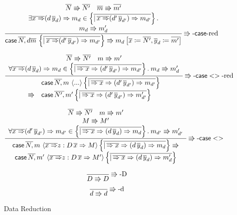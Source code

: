 \begin{figure}
\[
\frac{\begin{array}{c}
\overline{N}\Rrightarrow\overline{N'}\quad\overline{m}\Rrightarrow\overline{m'}\\
\exists\overline{x\Rightarrow}(d\,\overline{y}_{d})\Rightarrow m_{d}\in\left\{ \overline{|\,\overline{x\Rightarrow}(d'\,\overline{y}_{d'})\Rightarrow m_{d'}}\right\}. \\
m_{d}\Rrightarrow m_{d}'
\end{array}}{ \mathsf{case}{} \,\overline{N,}\,d\overline{m}\,\left\{ \overline{|\,\overline{x\Rightarrow}(d'\,\overline{y}_{d'})\Rightarrow m_{d'}}\right\} \Rrightarrow m_{d}\left[\overline{x}\coloneqq\overline{N'},\overline{y}_{d}\coloneqq\overline{m'}\right]
} \operatorname{\Rrightarrow-\mathsf{case}{}-red} 
\]

\[
\frac{\begin{array}{c}
\overline{N}\Rrightarrow\overline{N'}\quad m\Rrightarrow m'\\
\forall\overline{x\Rightarrow}(d\,\overline{y}_{d})\Rightarrow m_{d}\in\left\{ \overline{|\,\overline{\Rightarrow x}\Rightarrow(d'\,\overline{y}_{d'})\Rightarrow m_{d'}}\right\} .\:m_{d}\Rrightarrow m_{d}'
\end{array}}{
  \begin{array}{rl}
               & \mathsf{case}{} \,\overline{N,}\,m\,\left\langle ...\right\rangle \left\{ \overline{|\,\overline{\Rightarrow x}\Rightarrow(d'\,\overline{y}_{d'})\Rightarrow m_{d'}}\right\} \\
  \Rrightarrow & \mathsf{case}{} \,\overline{N',}\,m'\left\{ \overline{|\,\overline{\Rightarrow x}\Rightarrow(d'\,\overline{y}_{d'})\Rightarrow m_{d'}'}\right\} 
\end{array}
  } \operatorname{\Rrightarrow-\mathsf{case}{}<>-red} 
\]

\[
\frac{\begin{array}{c}
\overline{N}\Rrightarrow\overline{N'}\quad m\Rrightarrow m'\\
M\Rrightarrow M'\\
\forall\overline{x\Rightarrow}(d'\,\overline{y}_{d'})\Rightarrow m_{d'}\in\left\{ \overline{|\,\overline{\Rightarrow x}\Rightarrow(d\,\overline{y}_{d})\Rightarrow m_{d}}\right\} .\:m_{d'}\Rrightarrow m'_{d'}
\end{array}}{\begin{array}{c}
  \mathsf{case}{} \,\overline{N,}\,m\,\left\langle \overline{x\Rightarrow}z:D\,\overline{x}\Rightarrow M\right\rangle \left\{ \overline{|\,\overline{\Rightarrow x}\Rightarrow(d\,\overline{y}_{d})\Rightarrow m_{d}}\right\} \Rrightarrow\\
  \mathsf{case}{} \,\overline{N,}\,m'\,\left\langle \overline{x\Rightarrow}z:D\,\overline{x}\Rightarrow M'\right\rangle \left\{ \overline{|\,\overline{\Rightarrow x}\Rightarrow(d\,\overline{y}_{d})\Rightarrow m'_{d}}\right\} 
\end{array}
}\operatorname{\Rrightarrow-\mathsf{case}{}<>} 
\]

\[
\frac{\,}{D\Rrightarrow D}\operatorname{\Rrightarrow-D}
\]
\[
\frac{\,}{d\Rrightarrow d}\operatorname{\Rrightarrow-d}
\]
\caption{\SLang{} Data Reduction}
\label{fig:surface-data-red}
\end{figure}

